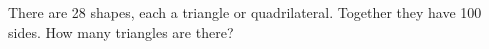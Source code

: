 There are 28 shapes, each a triangle or quadrilateral. Together they have 100 sides. How many triangles are there?

